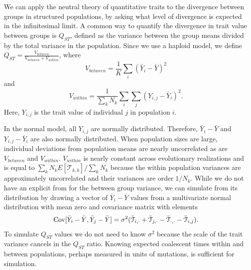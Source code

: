 We can apply the neutral theory of quantitative traits to the divergence between
groups in structured populations, by asking what level of divergence is expected
in the infinitesimal limit. A common way to quantify the divergence in trait
value between groups is $Q_{ST}$, defined as the variance between the group
means divided by the total variance in the population. Since we use a haploid
model, we define $Q_{ST} = \frac{V_{between}}{V_{between} + V_{within}}$, where
\begin{equation*}
  V_{between} = \frac{1}{K} \sum_i \left( \bar{Y}_i - \bar{Y} \right)^2
\end{equation*}
and
\begin{equation*}
  V_{within} = \frac{1}{\sum_k N_k} \sum_i \sum_j \left( Y_{i,j} - \bar{Y}_i \right)^2.
\end{equation*}
Here, $Y_{i,j}$ is the trait value of individual $j$ in population $i$.

In the normal model, all $Y_{i,j}$ are normally distributed. Therefore,
$\bar{Y}_{i} - \bar{Y}$ and $Y_{i,j} - \bar{Y}_i$ are also normally distributed.
When population sizes are large, individual deviations from population means are
nearly uncorrelated as are $V_{between}$ and $V_{within}$. $V_{within}$ is
nearly constant across evolutionary realizations and is equal to $\sum_k N_k
E[\mathcal{T}_{k,k}] / \sum_k N_k$ because the within population variances are
approximately uncorrelated and their variances are order $1/N_k$. While we do
not have an explicit from for the between group variance, we can simulate from
its distribution by drawing a vector of $\bar{Y}_{i} - \bar{Y}$ values from a
multivariate normal distribution with mean zero and covariance matrix with
elements
\begin{equation}
  \mathrm{Cov}[\bar{Y}_{i} - \bar{Y}, \bar{Y}_{j} - \bar{Y}] =
  \sigma^2(\bar{\mathcal{T}}_{i,\cdot} + \bar{\mathcal{T}}_{j,\cdot} -
  \bar{\mathcal{T}}_{\cdot,\cdot} - \bar{\mathcal{T}}_{i,j}).
\end{equation}
To simulate $Q_{ST}$ values we do not need to know $\sigma^2$ because the scale
of the trait variance cancels in the $Q_{ST}$ ratio. Knowing expected coalescent
times within and between populations, perhaps measured in units of mutations, is
sufficient for simulation.


